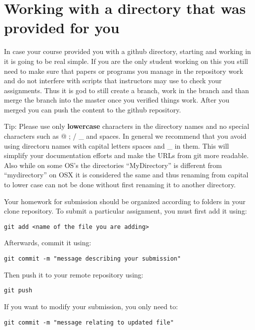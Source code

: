 \section{Working with a directory that was provided for you}

In case your course provided you with a github directory, starting and
working in it is going to be real simple. If you are the only student
working on this you still need to make sure that papers or programs
you manage in the repository work and do not interfere with scripts
that instructors may use to check your assignments. Thus it is god to
still create a branch, work in the branch and than merge the branch
into the master once you verified things work. After you merged you
can push the content to the github repository.

Tip: Please use only \textbf{lowercase} characters in the directory
names and no special characters such as @ ; / \_ and spaces. In general
we recommend that you avoid using directoru names with capital letters
spaces and \_ in them. This will simplify your documentation efforts and
make the URLs from git more readable. Also while on some OS's the
directories ``MyDirectory'' is different from ``mydirectory'' on OSX
it is considered the same and thus renaming from capital to lower case
can not be done without first renaming it to another directory. 


Your homework for submission should be organized according to folders in
your clone repository. To submit a particular assignment, you must first
add it using:

\begin{verbatim}
git add <name of the file you are adding>
\end{verbatim}

Afterwards, commit it using:

\begin{verbatim}
git commit -m "message describing your submission"
\end{verbatim}

Then push it to your remote repository using:

\begin{verbatim}
git push
\end{verbatim}

If you want to modify your submission, you only need to:

\begin{verbatim}
git commit -m "message relating to updated file"
\end{verbatim}

